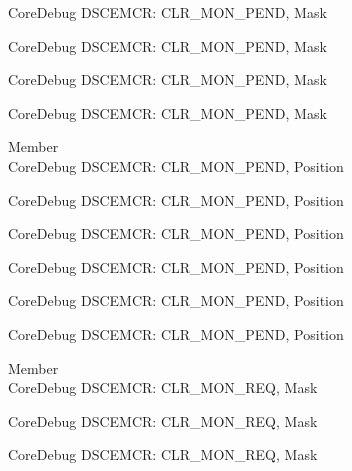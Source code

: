\begin{DoxyRefList}
\label{deprecated__deprecated000627}%
%
Core\+Debug DSCEMCR\+: CLR\+\_\+\+MON\+\_\+\+PEND, Mask 

\label{deprecated__deprecated000733}%
%
Core\+Debug DSCEMCR\+: CLR\+\_\+\+MON\+\_\+\+PEND, Mask 

\label{deprecated__deprecated001184}%
%
Core\+Debug DSCEMCR\+: CLR\+\_\+\+MON\+\_\+\+PEND, Mask 

\label{deprecated__deprecated001286}%
%
Core\+Debug DSCEMCR\+: CLR\+\_\+\+MON\+\_\+\+PEND, Mask  
\item[Member \doxylink{group___c_m_s_i_s___s_c_b_ga2295235d9c595bd6f287728f4c395bbf}{Core\+Debug\+\_\+\+DSCEMCR\+\_\+\+CLR\+\_\+\+MON\+\_\+\+PEND\+\_\+\+Pos} ]\hfill \\
\label{deprecated__deprecated000073}%
%
Core\+Debug DSCEMCR\+: CLR\+\_\+\+MON\+\_\+\+PEND, Position 

\label{deprecated__deprecated000524}%
%
Core\+Debug DSCEMCR\+: CLR\+\_\+\+MON\+\_\+\+PEND, Position 

\label{deprecated__deprecated000626}%
%
Core\+Debug DSCEMCR\+: CLR\+\_\+\+MON\+\_\+\+PEND, Position 

\label{deprecated__deprecated000732}%
%
Core\+Debug DSCEMCR\+: CLR\+\_\+\+MON\+\_\+\+PEND, Position 

\label{deprecated__deprecated001183}%
%
Core\+Debug DSCEMCR\+: CLR\+\_\+\+MON\+\_\+\+PEND, Position 

\label{deprecated__deprecated001285}%
%
Core\+Debug DSCEMCR\+: CLR\+\_\+\+MON\+\_\+\+PEND, Position  
\item[Member \doxylink{group___c_m_s_i_s___s_c_b_gaea36b8cede2cc1184176eb20b7bd0f8d}{Core\+Debug\+\_\+\+DSCEMCR\+\_\+\+CLR\+\_\+\+MON\+\_\+\+REQ\+\_\+\+Msk} ]\hfill \\
\label{deprecated__deprecated000072}%
%
Core\+Debug DSCEMCR\+: CLR\+\_\+\+MON\+\_\+\+REQ, Mask 

\label{deprecated__deprecated000523}%
%
Core\+Debug DSCEMCR\+: CLR\+\_\+\+MON\+\_\+\+REQ, Mask 

\label{deprecated__deprecated000625}%
%
Core\+Debug DSCEMCR\+: CLR\+\_\+\+MON\+\_\+\+REQ, Mask 


\end{DoxyRefList}
